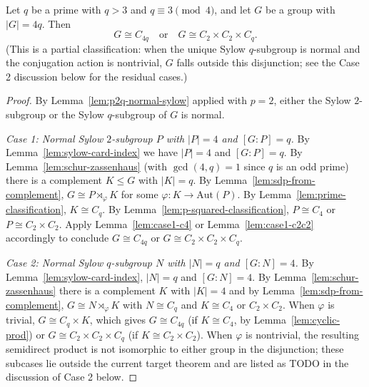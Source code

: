 \begin{theorem}
    \label{thm:classification-4q}
    Let $q$ be a prime with $q > 3$ and $q \equiv 3 \pmod 4$, and let $G$ be
    a group with $|G| = 4q$. Then
    \[
        G \cong C_{4q} \quad \text{or} \quad G \cong C_2 \times C_2 \times C_q.
    \]
    (This is a partial classification: when the unique Sylow $q$-subgroup is
    normal and the conjugation action is nontrivial, $G$ falls outside this
    disjunction; see the Case 2 discussion below for the residual cases.)
\end{theorem}
\begin{proof}
    By Lemma~\ref{lem:p2q-normal-sylow} applied with $p = 2$, either the
    Sylow $2$-subgroup or the Sylow $q$-subgroup of $G$ is normal.

    \emph{Case 1: Normal Sylow $2$-subgroup $P$ with $|P| = 4$ and $[G:P] = q$.}
    By Lemma~\ref{lem:sylow-card-index} we have $|P| = 4$ and $[G:P] = q$. By
    Lemma~\ref{lem:schur-zassenhaus} (with $\gcd(4, q) = 1$ since $q$ is an
    odd prime) there is a complement $K \leq G$ with $|K| = q$. By
    Lemma~\ref{lem:sdp-from-complement}, $G \cong P \rtimes_\varphi K$ for
    some $\varphi : K \to \mathrm{Aut}(P)$. By
    Lemma~\ref{lem:prime-classification}, $K \cong C_q$. By
    Lemma~\ref{lem:p-squared-classification}, $P \cong C_4$ or
    $P \cong C_2 \times C_2$. Apply Lemma~\ref{lem:case1-c4} or
    Lemma~\ref{lem:case1-c2c2} accordingly to conclude
    $G \cong C_{4q}$ or $G \cong C_2 \times C_2 \times C_q$.

    \emph{Case 2: Normal Sylow $q$-subgroup $N$ with $|N| = q$ and $[G:N] = 4$.}
    By Lemma~\ref{lem:sylow-card-index}, $|N| = q$ and $[G:N] = 4$. By
    Lemma~\ref{lem:schur-zassenhaus} there is a complement $K$ with
    $|K| = 4$ and by Lemma~\ref{lem:sdp-from-complement},
    $G \cong N \rtimes_\varphi K$ with $N \cong C_q$ and $K \cong C_4$ or
    $C_2 \times C_2$. When $\varphi$ is trivial, $G \cong C_q \times K$, which
    gives $G \cong C_{4q}$ (if $K \cong C_4$, by
    Lemma~\ref{lem:cyclic-prod}) or $G \cong C_2 \times C_2 \times C_q$ (if
    $K \cong C_2 \times C_2$). When $\varphi$ is nontrivial, the resulting
    semidirect product is not isomorphic to either group in the disjunction;
    these subcases lie outside the current target theorem and are listed as
    TODO in the discussion of Case 2 below.
\end{proof}

